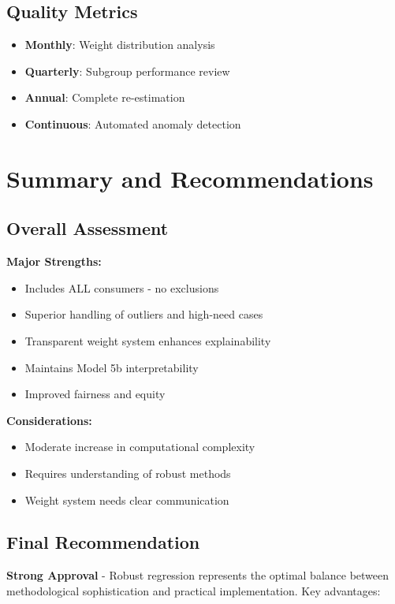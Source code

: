 \subsection{Quality Metrics}

\begin{itemize}
    \item \textbf{Monthly}: Weight distribution analysis
    \item \textbf{Quarterly}: Subgroup performance review
    \item \textbf{Annual}: Complete re-estimation
    \item \textbf{Continuous}: Automated anomaly detection
\end{itemize}

\section{Summary and Recommendations}

\subsection{Overall Assessment}

\textbf{Major Strengths:}
\begin{itemize}
    \item Includes ALL consumers - no exclusions
    \item Superior handling of outliers and high-need cases
    \item Transparent weight system enhances explainability
    \item Maintains Model 5b interpretability
    \item Improved fairness and equity
\end{itemize}

\textbf{Considerations:}
\begin{itemize}
    \item Moderate increase in computational complexity
    \item Requires understanding of robust methods
    \item Weight system needs clear communication
\end{itemize}

\subsection{Final Recommendation}

\textbf{Strong Approval} - Robust regression represents the optimal balance between methodological sophistication and practical implementation. Key advantages:

